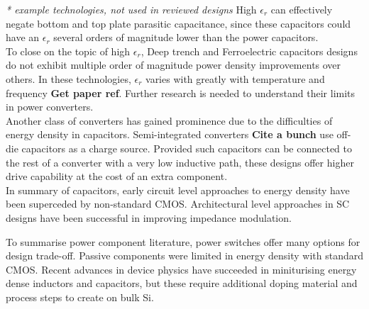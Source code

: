 \documentclass[letterpaper,twocolumn,10pt]{article}
\begin{document}
\textit{* example technologies, not used in reviewed designs}
High $\epsilon_r$ can effectively negate bottom and top plate parasitic capacitance, since these capacitors could have an $\epsilon_r$ several orders of magnitude lower than the power capacitors.\\ 
To close on the topic of high $\epsilon_r$, Deep trench and Ferroelectric capacitors designs do not exhibit multiple order of magnitude power density improvements over others. In these technologies, $\epsilon_r$ varies with greatly with temperature \cite{Lee2004} and frequency \textbf{Get paper ref}. %
Further research is needed to understand their limits in power converters.\\
Another class of converters has gained prominence due to the difficulties of energy density in capacitors. Semi-integrated converters \textbf{Cite a bunch} use off-die capacitors as a charge source. Provided such capacitors can be connected to the rest of a converter with a very low inductive path, these designs offer higher drive capability at the cost of an extra component.\\
\indent In summary of capacitors, early circuit level approaches to energy density have been superceded by non-standard CMOS. Architectural level approaches in SC designs have been successful in improving impedance modulation.

\indent To summarise power component literature, power switches offer many options for design trade-off. Passive components were limited in energy density with standard CMOS. Recent advances in device physics have succeeded in miniturising energy dense inductors and capacitors, but these require additional doping material and process steps to create on bulk Si.\\
\end{document}
